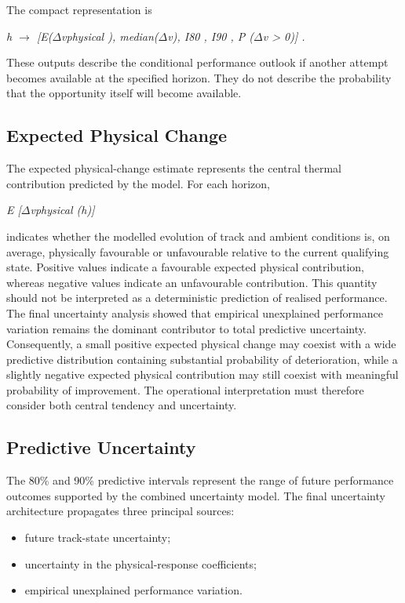 The compact representation is

\begin{center}\textit{h \ensuremath{\rightarrow} [E(\ensuremath{\Delta}vphysical ), median(\ensuremath{\Delta}v), I80 , I90 , P (\ensuremath{\Delta}v > 0)] .}\end{center}

These outputs describe the conditional performance outlook if another attempt becomes available at the specified horizon. They do not describe the probability that the opportunity itself will become available.

\subsection{Expected Physical Change}
The expected physical-change estimate represents the central thermal contribution predicted by the model. For each horizon,

\begin{center}\textit{E [\ensuremath{\Delta}vphysical (h)]}\end{center}

indicates whether the modelled evolution of track and ambient conditions is, on average, physically favourable or unfavourable relative to the current qualifying state. Positive values indicate a favourable expected physical contribution, whereas negative values indicate an unfavourable contribution. This quantity should not be interpreted as a deterministic prediction of realised performance. The final uncertainty analysis showed that empirical unexplained performance variation remains the dominant contributor to total predictive uncertainty. Consequently, a small positive expected physical change may coexist with a wide predictive distribution containing substantial probability of deterioration, while a slightly negative expected physical contribution may still coexist with meaningful probability of improvement. The operational interpretation must therefore consider both central tendency and uncertainty.

\subsection{Predictive Uncertainty}
The 80\% and 90\% predictive intervals represent the range of future performance outcomes supported by the combined uncertainty model. The final uncertainty architecture propagates three principal sources:

\begin{itemize}
\item future track-state uncertainty;
\item uncertainty in the physical-response coefficients;
\item empirical unexplained performance variation.
\end{itemize}

